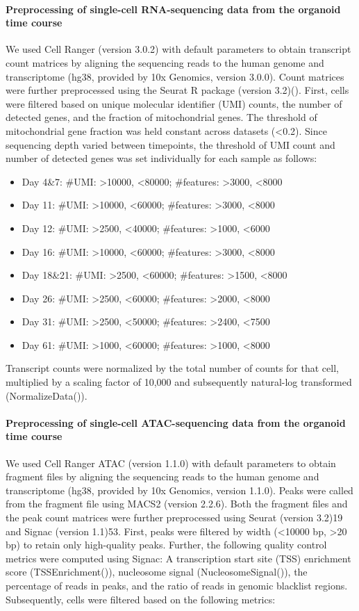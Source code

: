 \paragraph{Preprocessing of single-cell RNA-sequencing data from the organoid time course}
We used Cell Ranger (version 3.0.2) with default parameters to obtain transcript count matrices by aligning the sequencing reads to the human genome and transcriptome (hg38, provided by 10x Genomics, version 3.0.0). Count matrices were further preprocessed using the Seurat R package (version 3.2)(\cite{stuart_comprehensive_2019}). First, cells were filtered based on unique molecular identifier (UMI) counts, the number of detected genes, and the fraction of mitochondrial genes. The threshold of mitochondrial gene fraction was held constant across datasets (<0.2). Since sequencing depth varied between timepoints, the threshold of UMI count and number of detected genes was set individually for each sample as follows:
 
\begin{itemize}
\item Day 4\&7: \#UMI: >10000, <80000;  \#features: >3000, <8000 \
\item Day 11: \#UMI: >10000, <60000;  \#features: >3000, <8000 \
\item Day 12: \#UMI: >2500, <40000;  \#features: >1000, <6000 \
\item Day 16: \#UMI: >10000, <60000;  \#features: >3000, <8000 \
\item Day 18\&21: \#UMI: >2500, <60000;  \#features: >1500, <8000 \
\item Day 26: \#UMI: >2500, <60000;  \#features: >2000, <8000 \
\item Day 31: \#UMI: >2500, <50000;  \#features: >2400, <7500 \
\item Day 61: \#UMI: >1000, <60000;  \#features: >1000, <8000
\end{itemize}
 
Transcript counts were normalized by the total number of counts for that cell, multiplied by a scaling factor of 10,000 and subsequently natural-log transformed (NormalizeData()).
 
\paragraph{Preprocessing of single-cell ATAC-sequencing data from the organoid time course}
We used Cell Ranger ATAC (version 1.1.0) with default parameters to obtain fragment files by aligning the sequencing reads to the human genome and transcriptome (hg38, provided by 10x Genomics, version 1.1.0). Peaks were called from the fragment file using MACS2 (version 2.2.6). Both the fragment files and the peak count matrices were further preprocessed using Seurat (version 3.2)19 and Signac (version 1.1)53.  First, peaks were filtered by width (<10000 bp, >20 bp) to retain only high-quality peaks. Further, the following quality control metrics were computed using Signac: A transcription start site (TSS) enrichment score (TSSEnrichment()), nucleosome signal (NucleosomeSignal()), the percentage of reads in peaks, and the ratio of reads in genomic blacklist regions. Subsequently, cells were filtered based on the following metrics:

